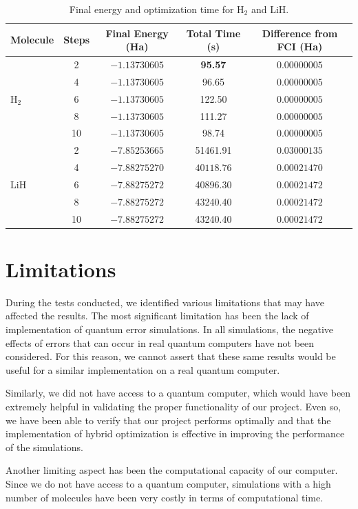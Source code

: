 \begin{table}[H]
  \centering
  \caption{Final energy and optimization time for \(\mathrm{H_2}\) and \(\mathrm{LiH}\).}
  \begin{scriptsize}
  \begin{tabular}{lcccc}
  \toprule
  \textbf{Molecule} & \textbf{Steps} & \textbf{Final Energy (Ha)} & \textbf{Total Time (s)} & \textbf{Difference from FCI (Ha)} \\
  \midrule
  \multirow{5}{*}{\(\mathrm{H_2}\)} 
    & 2  & \(-1.13730605\) & \textbf{95.57}  & \(0.00000005\) \\
    & 4  & \(-1.13730605\) & 96.65   & \(0.00000005\) \\
    & 6  & \(-1.13730605\) & 122.50  & \(0.00000005\) \\
    & 8  & \(-1.13730605\) & 111.27  & \(0.00000005\) \\
    & 10 & \(-1.13730605\) & 98.74   & \(0.00000005\) \\
  \midrule
  \multirow{5}{*}{\(\mathrm{LiH}\)} 
    & 2  & \(-7.85253665\) & 51461.91 & \(0.03000135\) \\
    & 4  & \(\mathbf{-7.88275270}\) & \(\mathbf{40118.76}\) & \(\mathbf{0.00021470}\) \\
    & 6  & \(-7.88275272\) & 40896.30 & \(0.00021472\) \\
    & 8  & \(-7.88275272\) & 43240.40 & \(0.00021472\) \\
    & 10 & \(-7.88275272\) & 43240.40 & \(0.00021472\) \\
  \bottomrule
  \end{tabular}
  \end{scriptsize}
\end{table}

\section{Limitations}
During the tests conducted, we identified various limitations that may have affected the results. The most significant limitation has been the lack of implementation of quantum error simulations. In all simulations, the negative effects of errors that can occur in real quantum computers have not been considered. For this reason, we cannot assert that these same results would be useful for a similar implementation on a real quantum computer.

Similarly, we did not have access to a quantum computer, which would have been extremely helpful in validating the proper functionality of our project. Even so, we have been able to verify that our project performs optimally and that the implementation of hybrid optimization is effective in improving the performance of the simulations.

Another limiting aspect has been the computational capacity of our computer. Since we do not have access to a quantum computer, simulations with a high number of molecules have been very costly in terms of computational time.